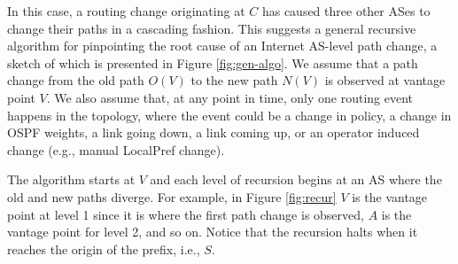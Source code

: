 In this case, a routing change originating at $C$ has caused three other ASes to change their paths 
in a cascading fashion. This suggests a general recursive algorithm for pinpointing the
root cause of an Internet AS-level path change, a sketch of which is
presented in Figure \ref{fig:gen-algo}. We assume that a path change from the old path
$O(V)$ to the new path $N(V)$ is observed at vantage point $V$. We also
assume that, at any point
in time, only one routing event happens in the topology, where the event could be a 
change in policy, a change in OSPF weights, a link going down, a link coming up, 
or an operator induced change (e.g., manual LocalPref change). 

The algorithm starts at $V$ and each level of recursion
begins at an AS where the old and new paths diverge. For example, in Figure \ref{fig:recur} $V$ is the
vantage point at level 1 since it is where the first path change is observed, $A$
is the vantage point for level 2, and so on.   Notice that the recursion halts when it reaches 
the origin of the prefix, i.e., $S$.

